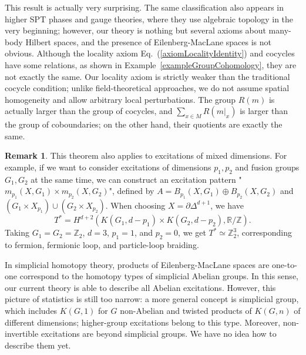 \documentclass[reprint, amsmath, amssymb, showpacs, floatfix, longbibliography, aps, twocolumn, superscriptaddress, nofootinbib]{revtex4-2}
\newcommand{\ZZ}{{\mathbb Z}}
\newcommand{\RR}{{\mathbb R}}
\theoremstyle{definition}
\newtheorem{remark}{Remark}[section]
\begin{document}
This result is actually very surprising. The same classification also appears in higher SPT phases and gauge theories, where they use algebraic topology in the very beginning; however, our theory is nothing but several axioms about many-body Hilbert spaces, and the presence of Eilenberg-MacLane spaces is not obvious.  Although the locality axiom Eq.~(\ref{axiomLocalityIdentity}) and cocycles have some relations, as shown in Example~\ref{exampleGroupCohomology}, they are not exactly the same. Our locality axiom is strictly weaker than the traditional cocycle condition;  unlike field-theoretical approaches, we do not assume spatial homogeneity and allow arbitrary local perturbations. The group $R(m)$ is actually larger than the group of cocycles, and $\sum_{x\in M}R(m|_x)$ is larger than the group of coboundaries; on the other hand, their quotients are exactly the same. 

\begin{remark}\label{remarkMixDimension}
	 This theorem also applies to excitations of mixed dimensions. For example, if we want to consider excitations of dimensions $p_1,p_2$ and fusion groups $G_1,G_2$ at the same time, we can construct an excitation pattern "$m_{p_1}(X,G_1)\times m_{p_2}(X,G_2)$", defined by $A=B_{p_1}(X,G_1)\oplus B_{p_2}(X,G_2)$ and $(G_1\times X_{p_1})\cup (G_2\times X_{p_2})$. When choosing $X=\partial\Delta^{d+1}$, we have
	\begin{equation}
		T^*=H^{d+2}(K(G_1,d-p_1)\times K(G_2,d-p_2),\RR/\ZZ).
	\end{equation}
	Taking $G_1=G_2=\ZZ_2$, $d=3$, $p_1=1$, and $p_2=0$, we get $T^*\simeq \ZZ_2^3$, corresponding to fermion, fermionic loop, and particle-loop braiding.
	
	In simplicial homotopy theory, products of Eilenberg-MacLane spaces are one-to-one correspond to the homotopy types of simplicial Abelian groups. In this sense, our current theory is able to describe all Abelian excitations. However, this picture of statistics is still too narrow: a more general concept is simplicial group, which includes $K(G,1)$ for $G$ non-Abelian and twisted products of $K(G,n)$ of different dimensions; higher-group excitations belong to this type. Moreover, non-invertible excitations are beyond simplicial groups. We have no idea how to describe them yet.
\end{remark}
\end{document}
